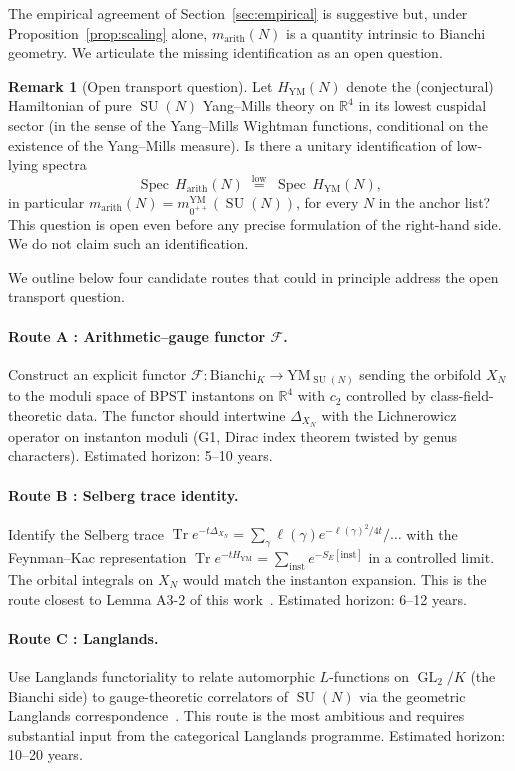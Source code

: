 \documentclass[11pt,a4paper]{article}
\theoremstyle{definition}
\newtheorem{remark}[theorem]{Remark}
\DeclareMathOperator{\SU}{SU}
\DeclareMathOperator{\Tr}{Tr}
\DeclareMathOperator{\GL}{GL}
\DeclareMathOperator{\Spec}{Spec}
\newcommand{\Harith}{H_{\mathrm{arith}}}
\newcommand{\marith}{m_{\mathrm{arith}}}
\newcommand{\RR}{\mathbb{R}}
\begin{document}
The empirical agreement of Section~\ref{sec:empirical} is suggestive but,
under Proposition~\ref{prop:scaling} alone, $\marith(N)$ is a quantity
intrinsic to Bianchi geometry. We articulate the missing identification as
an open question.

\begin{remark}[Open transport question]\label{rem:transport}
Let $H_{\mathrm{YM}}(N)$ denote the (conjectural) Hamiltonian of pure
$\SU(N)$ Yang--Mills theory on $\RR^4$ in its lowest cuspidal sector
(in the sense of the Yang--Mills Wightman functions, conditional on the
existence of the Yang--Mills measure). Is there a unitary identification
of low-lying spectra
\[
  \Spec\,\Harith(N) \;\stackrel{\mathrm{low}}{=}\;
  \Spec\,H_{\mathrm{YM}}(N),
\]
in particular $\marith(N) = m_{0^{++}}^{\mathrm{YM}}(\SU(N))$, for every
$N$ in the anchor list? This question is open even before any precise
formulation of the right-hand side. We do not claim such an identification.
\end{remark}

We outline below four candidate routes that could in principle address
the open transport question.

\paragraph{Route A : Arithmetic--gauge functor $\mathcal{F}$.}
Construct an explicit functor $\mathcal{F} : \mathrm{Bianchi}_K
\to \mathrm{YM}_{\SU(N)}$ sending the orbifold $X_N$ to the moduli space of
BPST instantons on $\RR^4$ with $c_2$ controlled by class-field-theoretic
data. The functor should intertwine $\Delta_{X_N}$ with the Lichnerowicz
operator on instanton moduli (G1, Dirac index theorem twisted by genus
characters). Estimated horizon: 5--10 years.

\paragraph{Route B : Selberg trace identity.}
Identify the Selberg trace
$\Tr e^{-t\Delta_{X_N}} = \sum_\gamma \ell(\gamma) e^{-\ell(\gamma)^2/4t}/\ldots$
with the Feynman--Kac representation
$\Tr e^{-tH_{\mathrm{YM}}} = \sum_{\mathrm{inst}} e^{-S_E[\mathrm{inst}]}$ in
a controlled limit. The orbital integrals on $X_N$ would match the instanton
expansion. This is the route closest to Lemma A3-2 of this work~\cite[\S 5]{Remondiere2026A32}.
Estimated horizon: 6--12 years.

\paragraph{Route C : Langlands.}
Use Langlands functoriality to relate automorphic $L$-functions on
$\GL_2/K$ (the Bianchi side) to gauge-theoretic correlators of $\SU(N)$
via the geometric Langlands correspondence~\cite{Frenkel}. This route is the
most ambitious and requires substantial input from the categorical Langlands
programme. Estimated horizon: 10--20 years.
\end{document}

